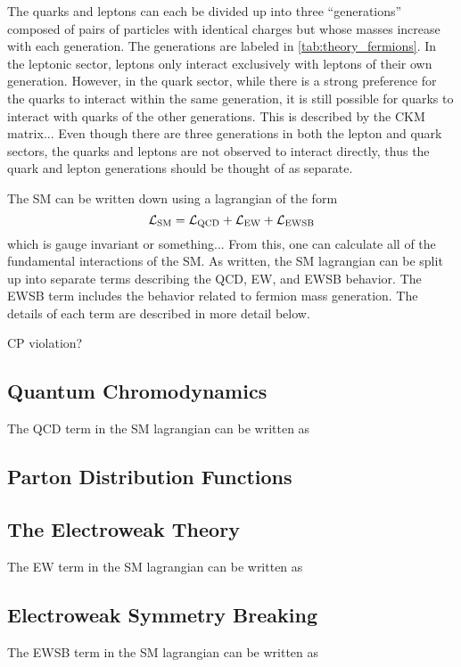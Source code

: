 The quarks and leptons can each be divided up into three ``generations'' composed of pairs
of particles with identical charges but whose masses increase with each generation.
The generations are labeled in \tab\ref{tab:theory_fermions}. 
In the leptonic sector, leptons only interact exclusively with leptons of their own generation.
However, in the quark sector, while there is a strong preference for the quarks to interact
within the same generation, it is still possible for quarks to interact with quarks of 
the other generations. This is described by the CKM matrix... %
Even though there are three 
generations in both the lepton and quark sectors, 
the quarks and leptons are not observed to interact directly, 
thus the quark and lepton generations should be thought of as separate.


The SM can be written down using a lagrangian of the form
\begin{equation}
\mathcal{L}_{\textrm{SM}} = \mathcal{L}_{\textrm{QCD}} + \mathcal{L}_{\textrm{EW}} + \mathcal{L}_{\textrm{EWSB}}
\end{equation}
which is gauge invariant or something...
From this, one can calculate all of the fundamental interactions of the SM.
As written, the SM lagrangian can be split up into separate terms describing the
QCD, EW, and EWSB behavior. 
The EWSB term includes the behavior related to fermion mass generation.
The details of each term are described in more detail below.

CP violation?

\subsection{Quantum Chromodynamics}
The QCD term in the SM lagrangian can be written as
\subsection{Parton Distribution Functions}
\subsection{The Electroweak Theory}
The EW term in the SM lagrangian can be written as
\subsection{Electroweak Symmetry Breaking}
The EWSB term in the SM lagrangian can be written as



